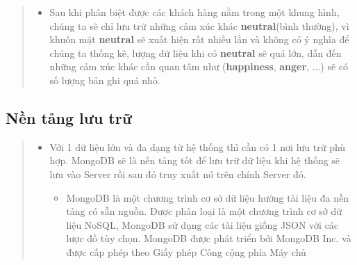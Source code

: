\documentclass{article}
\begin{document}
\begin{quote}
\begin{itemize}
   \item Sau khi phân biệt được các khách hàng nằm trong một khung hình, chúng ta sẽ chỉ lưu trữ những cảm xúc khác \textbf{neutral}(bình thường), vì khuôn mặt \textbf{neutral} sẽ xuất hiện rất nhiều lần và không có ý nghĩa để chúng ta thống kê, lượng dữ liệu khi có \textbf{neutral} sẽ quá lớn, dẫn đến những cảm xúc khác cần quan tâm như (\textbf{happiness}, \textbf{anger}, ...) sẽ có số lượng bản ghi quá nhỏ.
   \end{itemize}


\end{quote}
\subsection{Nền tảng lưu trữ}
\begin{quote}
   \begin{itemize}
      \item Với 1 dữ liệu lớn và đa dạng từ hệ thống thì cần có 1 nơi lưu trữ phù hợp. MongoDB sẽ là nền tảng tốt để lưu trữ dữ liệu khi hệ thống sẽ lưu vào Server rồi sau đó truy xuất nó trên chính Server đó.
      \begin{itemize}
         \item MongoDB
         là một chương trình cơ sở dữ liệu hướng tài liệu đa nền tảng có sẵn nguồn. Được phân loại là một chương trình cơ sở dữ liệu NoSQL, MongoDB sử dụng các tài liệu giống JSON với các lược đồ tùy chọn. MongoDB được phát triển bởi MongoDB Inc. và được cấp phép theo Giấy phép Công cộng phía Máy chủ
         \end{itemize}
   \end{itemize}
\end{quote}
\end{document}
